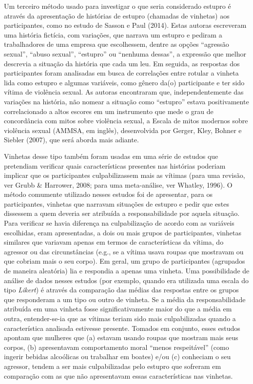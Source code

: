 Um terceiro método usado para investigar o que seria considerado estupro é através da apresentação de histórias de estupro (chamadas de vinhetas) aos participantes, como no estudo de Sasson e Paul (2014). Estas autoras escreveram uma história fictícia, com variações, que narrava um estupro e pediram a trabalhadores de uma empresa que escolhessem, dentre as opções ``agressão sexual'', ``abuso sexual'', ``estupro'' ou ``nenhuma dessas'', a expressão que melhor descrevia a situação da história que cada um leu. Em seguida, as respostas dos participantes foram analisadas em busca de correlações entre rotular a vinheta lida como estupro e algumas variáveis, como gênero da(o) participante e ter sido vítima de violência sexual. As autoras encontraram que, independentemente das variações na história, não nomear a situação como ``estupro'' estava positivamente correlacionado a altos escores em um instrumento que mede o grau de concordância com mitos sobre violência sexual, a Escala de mitos modernos sobre violência sexual (AMMSA, em inglês), desenvolvida por Gerger, Kley, Bohner e Siebler (2007), que será aborda mais adiante.

Vinhetas desse tipo também foram usadas em uma série de estudos que pretendiam verificar quais características presentes nas histórias poderiam implicar que os participantes culpabilizassem mais as vítimas (para uma revisão, ver Grubb \& Harrower, 2008; para uma meta-análise, ver Whatley, 1996). O método comumente utilizado nesses estudos foi de apresentar, para os participantes, vinhetas que narravam situações de estupro e pedir que estes dissessem a quem deveria ser atribuída a responsabilidade por aquela situação. Para verificar se havia diferença na culpabilização de acordo com as variáveis escolhidas, eram apresentadas, a dois ou mais grupos de participantes, vinhetas similares que variavam apenas em termos de características da vítima, do agressor ou das circunstâncias (e.g., se a vítima usava roupas que mostravam ou que cobriam mais o seu corpo). Em geral, um grupo de participantes (agrupados de maneira aleatória) lia e respondia a apenas uma vinheta. Uma possibilidade de análise de dados nesses estudos (por exemplo, quando era utilizada uma escala do tipo \textit{Likert}) é através da comparação das médias das respostas entre os grupos que responderam a um tipo ou outro de vinheta. Se a média da responsabilidade atribuída em uma vinheta fosse significativamente maior do que a média em outra, entender-se-ia que as vítimas teriam sido mais culpabilizadas quando a característica analisada estivesse presente. Tomados em conjunto, esses estudos apontam que mulheres que (a) estavam usando roupas que mostram mais seus corpos, (b) apresentavam comportamento moral ``menos respeitável'' (como ingerir bebidas alcoólicas ou trabalhar em boates) e/ou (c) conheciam o seu agressor, tendem a ser mais culpabilizadas pelo estupro que sofreram em comparação com as que não apresentavam essas características nas vinhetas.

